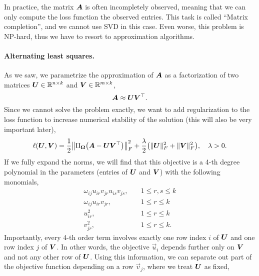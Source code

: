 In practice, the matrix $\bm{A}$ is often incompletely observed, meaning that we can only compute
the loss function \wrt the observed entries. This task is called ``Matrix completion'', and we
cannot use SVD in this case. Even worse, this problem is NP-hard, thus we have to resort to
approximation algorithms.

\paragraph{Alternating least squares.}

As we saw, we parametrize the approximation of $\bm{A}$ as a factorization of two matrices
$\bm{U} \in \mathbb{R}^{n \times k}$ and $\bm{V} \in \mathbb{R}^{m \times k}$, \[
    \bm{A} \approx \bm{U} \bm{V}^\top.
\]
Since we cannot solve the problem exactly, we want to add regularization to the loss function to
increase numerical stability of the solution (this will also be very important later), \[
    \ell(\mat{U}, \mat{V}) = \frac{1}{2} \lft\| \Pi_{\mat{\Omega}}\lft( \mat{A} - \mat{U} \transpose{\mat{V}} \rgt) \rgt\|^2_F + \frac{\lambda}{2} \lft( \| \mat{U} \|_F^2 + \| \mat{V} \|_F^2 \rgt), \quad \lambda > 0.
\]
If we fully expand the norms, we will find that this objective is a 4-th degree polynomial in the
parameters (entries of $\bm{U}$ and $\bm{V}$) with the following monomials,
\begin{align*}
    \omega_{ij} u_{ir} v_{jr} u_{is} v_{js}, & \quad 1 \leq r, s \leq k \\
    \omega_{ij} u_{ir} v_{jr},               & \quad 1 \leq r \leq k    \\
    u_{ir}^2,                                & \quad 1 \leq r \leq k    \\
    v_{jr}^2,                                & \quad 1 \leq r \leq k.
\end{align*}
Importantly, every 4-th order term involves exactly one row index $i$ of $\bm{U}$ and one row index
$j$ of $\bm{V}$. In other words, the objective \wrt $\vec{u}_i$ depends further only on $\bm{V}$ and not any
other row of $\bm{U}$. Using this information, we can separate out part of the objective
function depending on a row $\vec{v}_j$, where we treat $\bm{U}$ as fixed,
